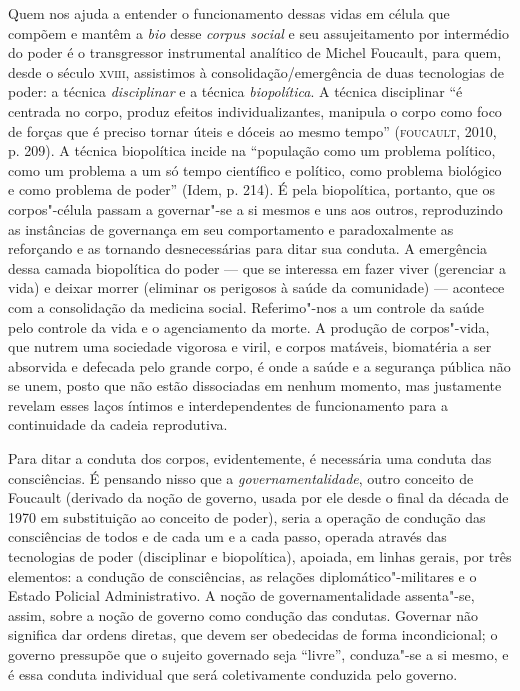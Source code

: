 Quem nos ajuda a entender o funcionamento dessas vidas em célula que
compõem e mantêm a \emph{bio} desse \emph{corpus social} e seu
assujeitamento por intermédio do poder é o transgressor instrumental
analítico de Michel Foucault, para quem, desde o século \textsc{xviii},
assistimos à consolidação/emergência de duas tecnologias de poder: a
técnica \emph{disciplinar} e a técnica \emph{biopolítica}. A técnica
disciplinar ``é centrada no corpo, produz efeitos individualizantes,
manipula o corpo como foco de forças que é preciso tornar úteis e dóceis
ao mesmo tempo'' (\textsc{foucault}, 2010, p. 209). A técnica biopolítica incide
na ``população como um problema político, como um problema a um só tempo
científico e político, como problema biológico e como problema de
poder'' (Idem, p. 214). É pela biopolítica, portanto, que os
corpos"-célula passam a governar"-se a si mesmos e uns aos outros,
reproduzindo as instâncias de governança em seu comportamento e
paradoxalmente as reforçando e as tornando desnecessárias para ditar sua
conduta. A emergência dessa camada biopolítica do poder --- que se
interessa em fazer viver (gerenciar a vida) e deixar morrer (eliminar os
perigosos à saúde da comunidade) --- acontece com a consolidação da
medicina social. Referimo"-nos a um controle da saúde pelo controle da
vida e o agenciamento da morte. A produção de corpos"-vida, que nutrem
uma sociedade vigorosa e viril, e corpos matáveis, biomatéria a ser
absorvida e defecada pelo grande corpo, é onde a saúde e a segurança
pública não se unem, posto que não estão dissociadas em nenhum momento,
mas justamente revelam esses laços íntimos e interdependentes de
funcionamento para a continuidade da cadeia reprodutiva.

Para ditar a conduta dos corpos, evidentemente, é necessária uma conduta
das consciências. É pensando nisso que a \emph{governamentalidade},
outro conceito de Foucault (derivado da noção de governo, usada por ele
desde o final da década de 1970 em substituição ao conceito de poder),
seria a operação de condução das consciências de todos e de cada um e a
cada passo, operada através das tecnologias de poder (disciplinar e
biopolítica), apoiada, em linhas gerais, por três elementos: a condução
de consciências, as relações diplomático"-militares e o Estado Policial
Administrativo. A noção de governamentalidade assenta"-se, assim, sobre a
noção de governo como condução das condutas. Governar não significa dar
ordens diretas, que devem ser obedecidas de forma incondicional; o
governo pressupõe que o sujeito governado seja ``livre'', conduza"-se a
si mesmo, e é essa conduta individual que será coletivamente conduzida
pelo governo.

